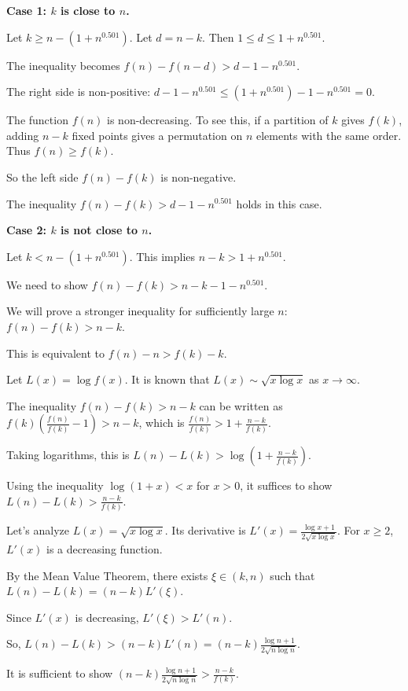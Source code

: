 \documentclass[12pt,a4paper]{article}
\theoremstyle{definition}
\begin{document}
    \textbf{Case 1: $k$ is close to $n$.}

    Let $k \geq n - (1+n^{0.501})$. Let $d=n-k$. Then $1 \leq d \leq 1+n^{0.501}$.

    The inequality becomes $f(n) - f(n-d) > d-1-n^{0.501}$.

    The right side is non-positive: $d-1-n^{0.501} \leq (1+n^{0.501})-1-n^{0.501} = 0$.

    The function $f(n)$ is non-decreasing. To see this, if a partition of $k$ gives $f(k)$, adding $n-k$ fixed points gives a permutation on $n$ elements with the same order. Thus $f(n) \geq f(k)$.

    So the left side $f(n)-f(k)$ is non-negative.

    The inequality $f(n)-f(k) > d-1-n^{0.501}$ holds in this case.

    \textbf{Case 2: $k$ is not close to $n$.}

    Let $k < n - (1+n^{0.501})$. This implies $n-k > 1+n^{0.501}$.

    We need to show $f(n) - f(k) > n-k-1-n^{0.501}$.

    We will prove a stronger inequality for sufficiently large $n$: $f(n)-f(k) > n-k$.

    This is equivalent to $f(n)-n > f(k)-k$.

    Let $L(x) = \log f(x)$. It is known that $L(x) \sim \sqrt{x \log x}$ as $x \to \infty$.

    The inequality $f(n)-f(k) > n-k$ can be written as $f(k)\left(\frac{f(n)}{f(k)}-1\right) > n-k$, which is $\frac{f(n)}{f(k)} > 1+\frac{n-k}{f(k)}$.

    Taking logarithms, this is $L(n)-L(k) > \log\left(1+\frac{n-k}{f(k)}\right)$.

    Using the inequality $\log(1+x) < x$ for $x>0$, it suffices to show $L(n)-L(k) > \frac{n-k}{f(k)}$.

    Let's analyze $L(x) = \sqrt{x \log x}$. Its derivative is $L'(x) = \frac{\log x+1}{2\sqrt{x\log x}}$. For $x \geq 2$, $L'(x)$ is a decreasing function.

    By the Mean Value Theorem, there exists $\xi \in (k,n)$ such that $L(n)-L(k) = (n-k)L'(\xi)$.

    Since $L'(x)$ is decreasing, $L'(\xi) > L'(n)$.

    So, $L(n)-L(k) > (n-k)L'(n) = (n-k)\frac{\log n+1}{2\sqrt{n\log n}}$.

    It is sufficient to show $(n-k)\frac{\log n+1}{2\sqrt{n\log n}} > \frac{n-k}{f(k)}$.
\end{document}
